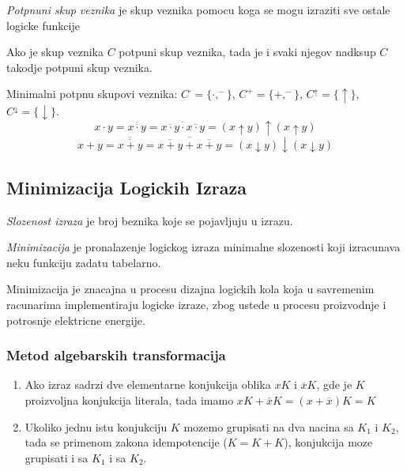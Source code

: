 \documentclass[12p,a4paper]{article}
\begin{document}
\begin{multicols}{2}
    \emph{Potpnuni skup veznika} je skup veznika pomocu koga se mogu izraziti
    sve ostale logicke funkcije

    Ako je skup veznika $C$ potpuni skup veznika, tada je i svaki njegov 
    nadksup $C$ takodje potpuni skup veznika.

    Minimalni potpnu skupovi veznika: $C^\cdot = \{\cdot, ^-\}$, 
    $C^+ = \{+, ^-\}$, $C^\uparrow = \{\uparrow\}$, 
    $C^\downarrow = \{\downarrow\}$.
    \[
        x \cdot y = 
        \overline{\overline{x \cdot y}} = 
        \overline{\overline{x \cdot y} \cdot \overline{x \cdot y}} =
        (x \uparrow y) \uparrow (x \uparrow y)
    \]
    \[
        x + y =
        \overline{\overline{x + y}} =
        \overline{\overline{x + y} + \overline{x + y}} =
        (x \downarrow y) \downarrow (x \downarrow y)
    \]

    
    \subsection{Minimizacija Logickih Izraza}

    \emph{Slozenost izraza} je broj beznika koje se pojavljuju u izrazu.

    \emph{Minimizacija} je pronalazenje logickog izraza minimalne slozenosti
    koji izracunava neku funkciju zadatu tabelarno.

    Minimizacija je znacajna u procesu dizajna logickih kola koja u savremenim 
    racunarima implementiraju logicke izraze, zbog ustede u procesu 
    proizvodnje i potrosnje elektricne energije.

    \subsubsection{Metod algebarskih transformacija}
    
    \begin{enumerate}
        \itemsep0em
        \item Ako izraz sadrzi dve elementarne konjukcija oblika $xK$ i 
              $\overline{x}K$, gde je $K$ proizvoljna konjukcija literala, tada
              imamo $xK + \overline{x}K = (x + \overline{x})K = K$
        \item Ukoliko jednu istu konjukciju $K$ mozemo grupisati na dva nacina
              sa $K_1$ i $K_2$, tada se primenom zakona idempotencije 
              ($K = K + K$), konjukcija moze grupisati i sa $K_1$ i sa $K_2$.
    \end{enumerate}


\end{multicols}
\end{document}
